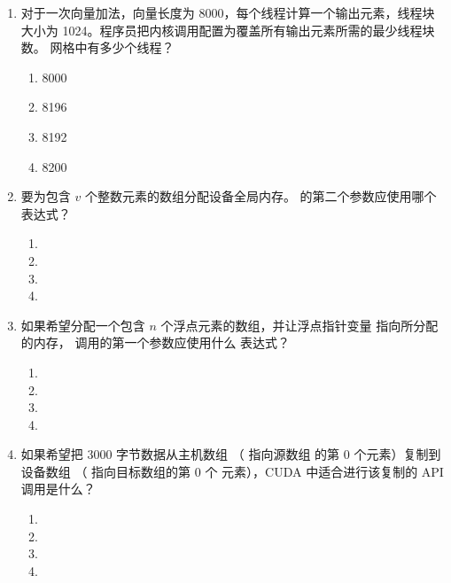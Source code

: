 \begin{enumerate}[label=\arabic*.,leftmargin=2.7em]
  \item 对于一次向量加法，向量长度为 8000，每个线程计算一个输出元素，线程块
  大小为 1024。程序员把内核调用配置为覆盖所有输出元素所需的最少线程块数。
  网格中有多少个线程？
  \begin{enumerate}[label=\alph*.,leftmargin=2.2em]
    \item 8000
    \item 8196
    \item 8192
    \item 8200
  \end{enumerate}

  \item 要为包含 $v$ 个整数元素的数组分配设备全局内存。
   的第二个参数应使用哪个表达式？
  \begin{enumerate}[label=\alph*.,leftmargin=2.2em]
    \item {}
    \item {}
    \item {}
    \item {}
  \end{enumerate}

  \item 如果希望分配一个包含 $n$ 个浮点元素的数组，并让浮点指针变量
   指向所分配的内存， 调用的第一个参数应使用什么
  表达式？
  \begin{enumerate}[label=\alph*.,leftmargin=2.2em]
    \item {}
    \item {}
    \item {}
    \item {}
  \end{enumerate}

  \item 如果希望把 3000 字节数据从主机数组 （ 指向源数组
  的第 0 个元素）复制到设备数组 （ 指向目标数组的第 0 个
  元素），CUDA 中适合进行该复制的 API 调用是什么？
  \begin{enumerate}[label=\alph*.,leftmargin=2.2em]
    \item {}
    \item {}
    \item {}
    \item {}
  \end{enumerate}


\end{enumerate}
